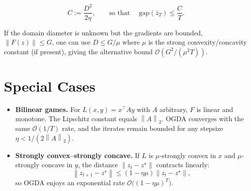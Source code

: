 \documentclass{article}
\newcommand{\norm}[1]{\left\|#1\right\|}
\begin{document}
\[
\boxed{C:=\frac{D^{2}}{2\eta}},\qquad
\text{so that } \quad
\text{gap}(\bar z_T)\le\frac{C}{T}.
\]

If the domain diameter is unknown but the gradients are bounded,
\(\norm{F(z)}\le G\), one can use \(D\le G/\mu\) where \(\mu\) is the strong
convexity/concavity constant (if present), giving the alternative bound
\(\mathcal{O}(G^{2}/(\mu^{2}T))\).

\section*{Special Cases}
\begin{itemize}
\item \textbf{Bilinear games.}  For \(L(x,y)=x^{\top}Ay\) with \(A\) arbitrary,
\(F\) is linear and monotone.  The Lipschitz constant equals \(\norm{A}_2\).
OGDA converges with the same \(\mathcal{O}(1/T)\) rate, and the iterates
remain bounded for any stepsize \(\eta<1/(2\norm{A}_2)\).
\item \textbf{Strongly convex–strongly concave.}  If \(L\) is \(\mu\)-strongly
convex in \(x\) and \(\mu\)-strongly concave in \(y\), the distance
\(\norm{z_t-z^\star}\) contracts linearly:
\[
\norm{z_{t+1}-z^\star}\le (1-\eta\mu)\norm{z_t-z^\star},
\]
so OGDA enjoys an exponential rate \(\mathcal{O}\big((1-\eta\mu)^T\big)\).
\end{itemize}
\end{document}
